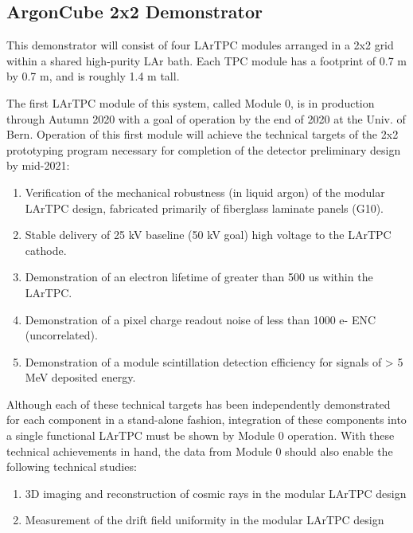 \subsection{ArgonCube 2x2 Demonstrator}
\label{sec:2x2Demo}

This demonstrator will consist of four LArTPC modules arranged in a 2x2 grid within a shared high-purity LAr bath.  
Each TPC module has a footprint of 0.7 m by 0.7 m, and is roughly 1.4 m tall.

The first LArTPC module of this system, called Module 0, is in production through Autumn 2020 with a goal of operation by the end of 2020 at the Univ. of Bern.  
Operation of this first module will achieve the technical targets of the 2x2 prototyping program necessary for completion of the detector preliminary design by mid-2021:
\begin{enumerate}
    \item Verification of the mechanical robustness (in liquid argon) of the modular LArTPC design, fabricated primarily of fiberglass laminate panels (G10).
    \item Stable delivery of 25 kV baseline (50 kV goal) high voltage to the LArTPC cathode.
    \item Demonstration of an electron lifetime of greater than 500 us within the LArTPC.
    \item Demonstration of a pixel charge readout noise of less than 1000 e- ENC (uncorrelated).
    \item Demonstration of a module scintillation detection efficiency for signals of > 5 MeV deposited energy.
\end{enumerate}

Although each of these technical targets has been independently demonstrated for each component in a stand-alone fashion, integration of these components into a single functional LArTPC must be shown by Module 0 operation.  
With these technical achievements in hand, the data from Module 0 should also enable the following technical studies:
\begin{enumerate}
    \item 3D imaging and reconstruction of cosmic rays in the modular LArTPC design
    \item Measurement of the drift field uniformity in the modular LArTPC design
\end{enumerate}

